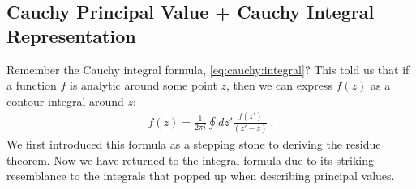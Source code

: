 \subsection{Cauchy Principal Value + Cauchy Integral Representation}

Remember the Cauchy integral formula, \eqref{eq:cauchy:integral}? This told us that if a function $f$ is analytic around some point $z$, then we can express $f(z)$ as a contour integral around $z$:
\begin{align}
	f(z) = \frac{1}{2\pi i}\oint dz' \frac{f(z')}{(z'-z)} \ .
\end{align}
We first introduced this formula as a stepping stone to deriving the residue theorem. Now we have returned to the integral formula due to its striking resemblance to the integrals that popped up when describing principal values.

